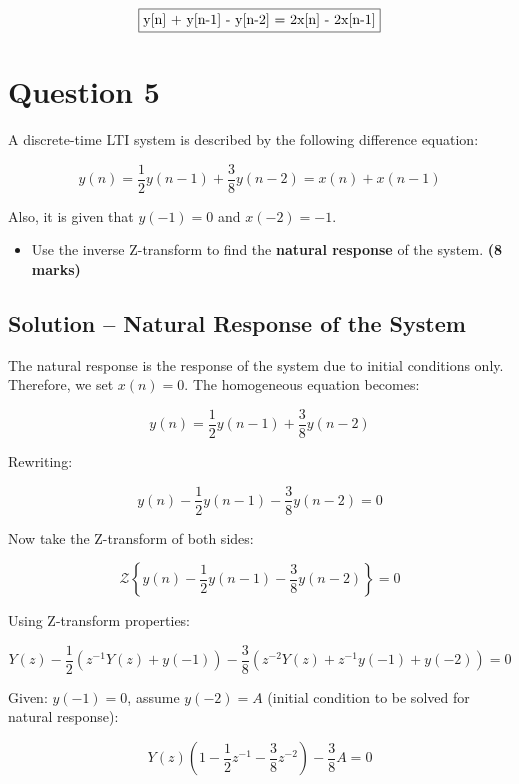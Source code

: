 \documentclass[12pt]{article}
\begin{document}
    \[
    \fbox{y[n] + y[n-1] - y[n-2] = 2x[n] - 2x[n-1]}
    \]
    
    
    
    
    
    \section*{Question 5}
    
    A discrete-time LTI system is described by the following difference equation:
    
    \[
    y(n) = \frac{1}{2}y(n-1) + \frac{3}{8}y(n-2) = x(n) + x(n-1)
    \]
    
    Also, it is given that \( y(-1) = 0 \) and \( x(-2) = -1 \).
    
    \begin{itemize}
    	\item Use the inverse Z-transform to find the \textbf{natural response} of the system.  \textbf{(8 marks)}
    \end{itemize}
    
    \subsection*{Solution – Natural Response of the System}
    
    The natural response is the response of the system due to initial conditions only. Therefore, we set \( x(n) = 0 \). The homogeneous equation becomes:
    
    \[
    y(n) = \frac{1}{2}y(n-1) + \frac{3}{8}y(n-2)
    \]
    
    Rewriting:
    
    \[
    y(n) - \frac{1}{2}y(n-1) - \frac{3}{8}y(n-2) = 0
    \]
    
    Now take the Z-transform of both sides:
    
    \[
    \mathcal{Z}\left\{y(n) - \frac{1}{2}y(n-1) - \frac{3}{8}y(n-2)\right\} = 0
    \]
    
    Using Z-transform properties:
    
    \[
    Y(z) - \frac{1}{2}(z^{-1}Y(z) + y(-1)) - \frac{3}{8}(z^{-2}Y(z) + z^{-1}y(-1) + y(-2)) = 0
    \]
    
    Given: \( y(-1) = 0 \), assume \( y(-2) = A \) (initial condition to be solved for natural response):
    
    \[
    Y(z)\left(1 - \frac{1}{2}z^{-1} - \frac{3}{8}z^{-2}\right) - \frac{3}{8}A = 0
    \]
    
\end{document}
